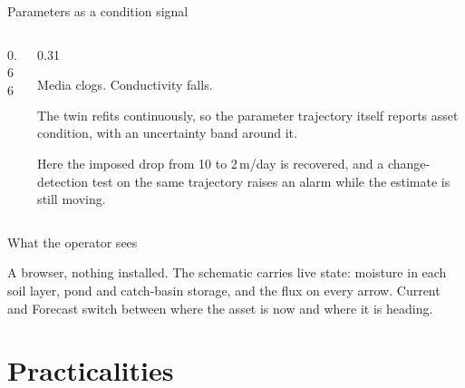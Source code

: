 \documentclass[aspectratio=169, 10pt]{beamer}
\begin{document}
\begin{frame}{Parameters as a condition signal}
  \begin{columns}[c,onlytextwidth]
    \begin{column}{0.66\textwidth}
    \end{column}
    \begin{column}{0.31\textwidth}
      {\footnotesize Media clogs. Conductivity falls.

      \vspace{0.6em}
      The twin refits continuously, so the \alert{parameter trajectory itself}
      reports asset condition, with an uncertainty band around it.

      \vspace{0.6em}
      Here the imposed drop from 10 to 2\,m/day is recovered, and a
      change-detection test on the same trajectory raises an alarm while the
      estimate is still moving.}
    \end{column}
  \end{columns}
\end{frame}

\begin{frame}{What the operator sees}
  \centering
  \setlength{\figslotmaxht}{0.74\textheight}
  \vspace{-0.4em}
  \parbox{\textwidth}{\scriptsize A browser, nothing installed. The schematic
  carries \alert{live state}: moisture in each soil layer, pond and catch-basin
  storage, and the flux on every arrow. \alert{Current} and \alert{Forecast}
  switch between where the asset is now and where it is heading.}
\end{frame}

\section{Practicalities}
\end{document}
